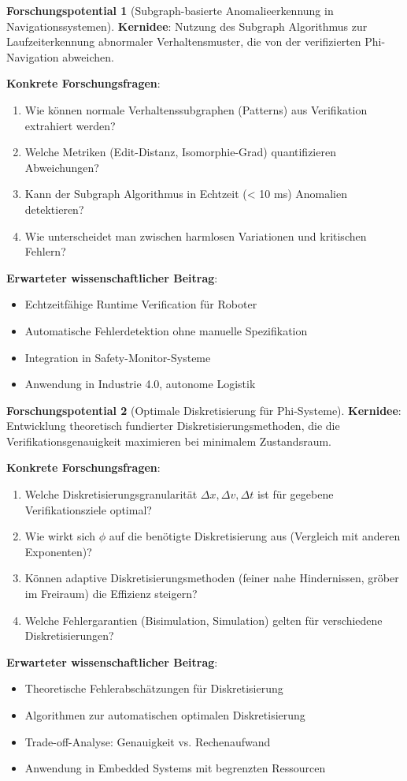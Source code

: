 ﻿\documentclass[a4paper,12pt]{article}
\theoremstyle{definition}
\newtheorem{potential}{Forschungspotential}[section]
\begin{document}
\begin{potential}[Subgraph-basierte Anomalieerkennung in Navigationssystemen]
\textbf{Kernidee}: Nutzung des Subgraph Algorithmus zur Laufzeiterkennung abnormaler Verhaltensmuster, die von der verifizierten Phi-Navigation abweichen.

\textbf{Konkrete Forschungsfragen}:
\begin{enumerate}
	\item Wie können normale Verhaltenssubgraphen (Patterns) aus Verifikation extrahiert werden?
	\item Welche Metriken (Edit-Distanz, Isomorphie-Grad) quantifizieren Abweichungen?
	\item Kann der Subgraph Algorithmus in Echtzeit (< 10 ms) Anomalien detektieren?
	\item Wie unterscheidet man zwischen harmlosen Variationen und kritischen Fehlern?
\end{enumerate}

\textbf{Erwarteter wissenschaftlicher Beitrag}:
\begin{itemize}
	\item Echtzeitfähige Runtime Verification für Roboter
	\item Automatische Fehlerdetektion ohne manuelle Spezifikation
	\item Integration in Safety-Monitor-Systeme
	\item Anwendung in Industrie 4.0, autonome Logistik
\end{itemize}
\end{potential}

\begin{potential}[Optimale Diskretisierung für Phi-Systeme]
\textbf{Kernidee}: Entwicklung theoretisch fundierter Diskretisierungsmethoden, die die Verifikationsgenauigkeit maximieren bei minimalem Zustandsraum.

\textbf{Konkrete Forschungsfragen}:
\begin{enumerate}
	\item Welche Diskretisierungsgranularität $\Delta x, \Delta v, \Delta t$ ist für gegebene Verifikationsziele optimal?
	\item Wie wirkt sich $\phi$ auf die benötigte Diskretisierung aus (Vergleich mit anderen Exponenten)?
	\item Können adaptive Diskretisierungsmethoden (feiner nahe Hindernissen, gröber im Freiraum) die Effizienz steigern?
	\item Welche Fehlergarantien (Bisimulation, Simulation) gelten für verschiedene Diskretisierungen?
\end{enumerate}

\textbf{Erwarteter wissenschaftlicher Beitrag}:
\begin{itemize}
	\item Theoretische Fehlerabschätzungen für Diskretisierung
	\item Algorithmen zur automatischen optimalen Diskretisierung
	\item Trade-off-Analyse: Genauigkeit vs. Rechenaufwand
	\item Anwendung in Embedded Systems mit begrenzten Ressourcen
\end{itemize}
\end{potential}
\end{document}
